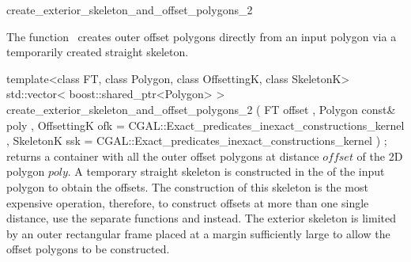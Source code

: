 

\begin{ccRefFunction}{create_exterior_skeleton_and_offset_polygons_2}


\ccDefinition

The function \ccRefName\ creates outer offset polygons directly from an input polygon via a temporarily created straight skeleton. 


\ccFunction
{template<class FT, class Polygon, class OffsettingK, class SkeletonK>
std::vector< boost::shared_ptr<Polygon> >
create_exterior_skeleton_and_offset_polygons_2 ( FT             offset
                                               , Polygon const& poly
                                               , OffsettingK   ofk 
                                                  = CGAL::Exact_predicates_inexact_constructions_kernel
                                               , SkeletonK      ssk 
                                                  = CGAL::Exact_predicates_inexact_constructions_kernel
                                               ) ;
}
{returns a container with all the outer offset polygons at distance $offset$ of the 2D polygon $poly$.
A temporary straight skeleton is constructed in the  of the input polygon to obtain the offsets. The construction of this skeleton is the most expensive operation, therefore, to construct offsets at more than one single distance, use the separate functions  and  instead. The exterior skeleton is limited by an outer rectangular frame placed at a margin sufficiently large to allow the offset polygons to be constructed.}


\end{ccRefFunction}
